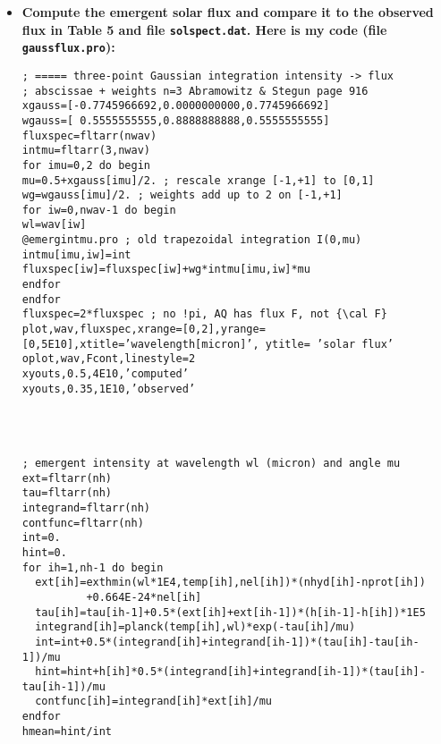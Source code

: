 \documentclass{article}
\begin{document}
    \begin{itemize}
\item
  \textbf{Compute the emergent solar flux and compare it to the observed
  flux in Table 5 and file \texttt{solspect.dat}. Here is my code (file
  \texttt{gaussflux.pro}):}

\begin{verbatim}
; ===== three-point Gaussian integration intensity -> flux
; abscissae + weights n=3 Abramowitz & Stegun page 916
xgauss=[-0.7745966692,0.0000000000,0.7745966692]
wgauss=[ 0.5555555555,0.8888888888,0.5555555555]
fluxspec=fltarr(nwav)
intmu=fltarr(3,nwav)
for imu=0,2 do begin
mu=0.5+xgauss[imu]/2. ; rescale xrange [-1,+1] to [0,1]
wg=wgauss[imu]/2. ; weights add up to 2 on [-1,+1]
for iw=0,nwav-1 do begin
wl=wav[iw]
@emergintmu.pro ; old trapezoidal integration I(0,mu)
intmu[imu,iw]=int
fluxspec[iw]=fluxspec[iw]+wg*intmu[imu,iw]*mu
endfor
endfor
fluxspec=2*fluxspec ; no !pi, AQ has flux F, not {\cal F}
plot,wav,fluxspec,xrange=[0,2],yrange=[0,5E10],xtitle=’wavelength[micron]’, ytitle= ’solar flux’
oplot,wav,Fcont,linestyle=2
xyouts,0.5,4E10,’computed’
xyouts,0.35,1E10,’observed’




; emergent intensity at wavelength wl (micron) and angle mu
ext=fltarr(nh)
tau=fltarr(nh)
integrand=fltarr(nh)
contfunc=fltarr(nh)
int=0.
hint=0.
for ih=1,nh-1 do begin 
  ext[ih]=exthmin(wl*1E4,temp[ih],nel[ih])*(nhyd[ih]-nprot[ih])
          +0.664E-24*nel[ih]
  tau[ih]=tau[ih-1]+0.5*(ext[ih]+ext[ih-1])*(h[ih-1]-h[ih])*1E5
  integrand[ih]=planck(temp[ih],wl)*exp(-tau[ih]/mu)
  int=int+0.5*(integrand[ih]+integrand[ih-1])*(tau[ih]-tau[ih-1])/mu
  hint=hint+h[ih]*0.5*(integrand[ih]+integrand[ih-1])*(tau[ih]-tau[ih-1])/mu
  contfunc[ih]=integrand[ih]*ext[ih]/mu
endfor
hmean=hint/int
\end{verbatim}
\end{itemize}
\end{document}
